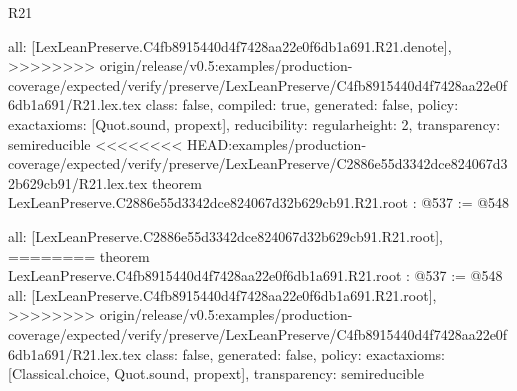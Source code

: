\begin{lexlean}{R21}
\begin{coremodule}
{{{{{  all: [LexLeanPreserve.C4fb8915440d4f7428aa22e0f6db1a691.R21.denote],
>>>>>>>> origin/release/v0.5:examples/production-coverage/expected/verify/preserve/LexLeanPreserve/C4fb8915440d4f7428aa22e0f6db1a691/R21.lex.tex
  class: false,
  compiled: true,
  generated: false,
  policy: exact{axioms: [Quot.sound, propext]},
  reducibility: regular{height: 2},
  transparency: semireducible
}
<<<<<<<< HEAD:examples/production-coverage/expected/verify/preserve/LexLeanPreserve/C2886e55d3342dce824067d32b629cb91/R21.lex.tex
theorem LexLeanPreserve.C2886e55d3342dce824067d32b629cb91.R21.root : @537 := @548 {
  all: [LexLeanPreserve.C2886e55d3342dce824067d32b629cb91.R21.root],
========
theorem LexLeanPreserve.C4fb8915440d4f7428aa22e0f6db1a691.R21.root : @537 := @548 {
  all: [LexLeanPreserve.C4fb8915440d4f7428aa22e0f6db1a691.R21.root],
>>>>>>>> origin/release/v0.5:examples/production-coverage/expected/verify/preserve/LexLeanPreserve/C4fb8915440d4f7428aa22e0f6db1a691/R21.lex.tex
  class: false,
  generated: false,
  policy: exact{axioms: [Classical.choice, Quot.sound, propext]},
  transparency: semireducible
}

}}}}}
\end{coremodule}
\end{lexlean}
